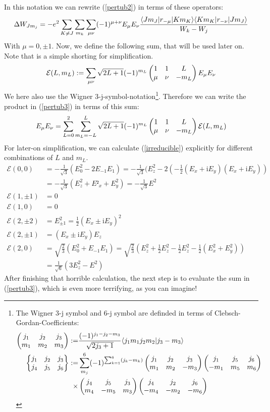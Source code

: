 In this notation we can rewrite (\ref{pertub2}) in terms of these operators:
\begin{equation}
\Delta W_{Jm_j}=-e^2\sum_{K\neq J}\sum_{m_k}\sum_{\mu\nu}(-1)^{\mu+\nu}E_\mu E_\nu\frac{\langle Jm_J| r_{-\mu} | Km_K\rangle\langle Km_K| r_{-\nu} | Jm_J\rangle}{W_k-W_j}\label{pertub3}
\end{equation}
With $\mu=0,\pm1$. Now, we define the following sum, that will be used later on. Note that is a simple shorting for simplification.
\begin{equation}
\mathcal{E}(L,m_L):=\sum_{\mu\nu}\sqrt{2L+1}(-1)^{m_L}\begin{pmatrix}1&1&L\\\mu&\nu&-m_L\end{pmatrix}E_\mu E_\nu\label{irreducible}
\end{equation}
We here also use the Wigner 3-j-symbol-notation\footnote{The Wigner 3-j symbol and 6-j symbol are definded in terms of Clebsch-Gordan-Coefficients:\begin{align}\begin{pmatrix}j_1&j_2&j_3\\m_1&m_2&m_3\end{pmatrix}:=&\frac{(-1)^{j_1-j_2-m_3}}{\sqrt{2j_3+1}}\langle j_1m_1j_2m_2 | j_3-m_3 \rangle\\\begin{Bmatrix}j_1&j_2&j_3\\j_4&j_5&j_6\end{Bmatrix}:=&\sum^6_{m_j}(-1)^{\sum^6_{k=1}(j_k-m_k)}\begin{pmatrix}j_1&j_2&j_3\\m_1&m_2&-m_3\end{pmatrix}\begin{pmatrix}j_1&j_5&j_6\\-m_1&m_5&m_6\end{pmatrix}\\\times&\begin{pmatrix}j_4&j_5&j_3\\m_4&-m_5&m_3\end{pmatrix}\begin{pmatrix}j_4&j_2&j_6\\-m_4&-m_2&-m_6\end{pmatrix}\label{jsymbols}\end{align}}. Therefore we can write the product in (\ref{pertub3}) in terms of this sum: 
\begin{equation}
E_\mu E_\nu=\sum^2_{L=0}\sum^L_{m_L=-L}\sqrt{2L+1}(-1)^{m_L}\begin{pmatrix}1&1&L\\\mu&\nu&-m_L\end{pmatrix}\mathcal{E}(L,m_L)
\end{equation}
For later-on simplification, we can calculate (\ref{irreducible}) explicitly for different combinations of $L$ and $m_L$.
\begin{align*}
\mathcal{E}(0,0)&=-\frac{1}{\sqrt{3}}(E^2_0-2E_{-1}E_{1})=-\frac{1}{\sqrt{3}}(E^2_z-2(-\frac{1}{2}(E_x+\mathrm{i}E_y)(E_x+\mathrm{i}E_y))\\&=-\frac{1}{\sqrt{3}}(E^2_z+E²_x+E^2_y)=-\frac{1}{\sqrt{3}}E^2\\
\mathcal{E}(1,\pm 1)&=0\\
\mathcal{E}(1,0)&=0\\
\mathcal{E}(2,\pm2)&=E^2_{\pm1}=\frac{1}{2}(E_x\pm \mathrm{i}E_y)^2\\
\mathcal{E}(2,\pm1)&=(E_x\pm \mathrm{i}E_y)E_z\\
\mathcal{E}(2,0)&=\sqrt{\frac{2}{3}}(E^2_0+E_{-1}E_1)=\sqrt{\frac{2}{3}}(E^2_z+\frac{1}{2}E^2_z-\frac{1}{2}E^2_z-\frac{1}{2}(E^2_x+E^2_y))\\&=\frac{1}{\sqrt{6}}(3E^2_z-E^2)
\end{align*}
After finishing that horrible calculation, the next step is to evaluate the sum in (\ref{pertub3}), which is even more terrifying, as you can imagine!

